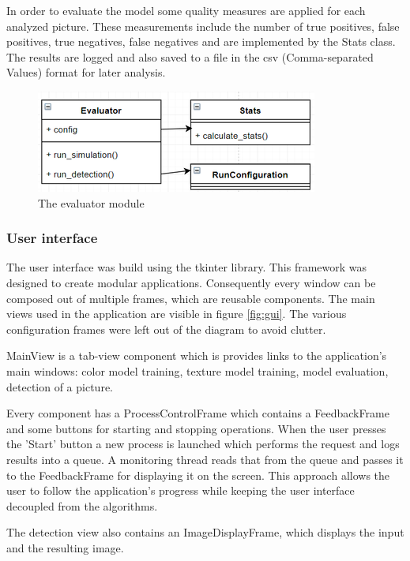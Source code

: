 \documentclass[12pt]{report}
\begin{document}
	In order to evaluate the model some quality measures are applied for each analyzed picture. These measurements include the number of true positives, false positives, true negatives, false negatives and are implemented by the Stats class. The results are logged and also saved to a file in the csv (Comma-separated Values) format for later analysis.
	
	\begin{figure}[h!]
		\centering
		\includegraphics[]{design/evaluator.png}
		\caption{The evaluator module}
		\label{fig:evaluator}
	\end{figure}
	
	\subsubsection{User interface}
	
	The user interface was build using the tkinter library. This framework was designed to create modular applications. Consequently every window can be composed out of multiple frames, which are reusable components. The main views used in the application are visible in figure \ref{fig:gui}. The various configuration frames were left out of the diagram to avoid clutter.
	
	MainView is a tab-view component which is provides links to the application's main windows: color model training, texture model training, model evaluation, detection of a picture.
	
	Every component has a ProcessControlFrame which contains a FeedbackFrame and some buttons for starting and stopping operations. When the user presses the 'Start' button a new process is launched which performs the request and logs results into a queue. A monitoring thread reads that from the queue and passes it to the FeedbackFrame for displaying it on the screen. This approach allows the user to follow the application's progress while keeping the user interface decoupled from the algorithms.
	
	The detection view also contains an ImageDisplayFrame, which displays the input and the resulting image.
	
\end{document}
